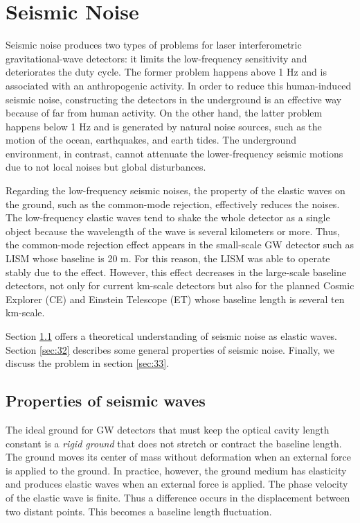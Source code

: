 \chapter{Seismic Noise} \label{chap2}
Seismic noise produces two types of problems for laser interferometric gravitational-wave detectors: it limits the low-frequency sensitivity and deteriorates the duty cycle. The former problem happens above 1 Hz and is associated with an anthropogenic activity. In order to reduce this human-induced seismic noise, constructing the detectors in the underground is an effective way because of far from human activity. On the other hand, the latter problem happens below 1 Hz and is generated by natural noise sources, such as the motion of the ocean, earthquakes, and earth tides. The underground environment, in contrast, cannot attenuate the lower-frequency seismic motions due to not local noises but global disturbances.

Regarding the low-frequency seismic noises, the property of the elastic waves on the ground, such as the common-mode rejection, effectively reduces the noises. The low-frequency elastic waves tend to shake the whole detector as a single object because the wavelength of the wave is several kilometers or more. Thus, the common-mode rejection effect appears in the small-scale GW detector such as LISM whose baseline is 20 m. For this reason, the LISM was able to operate stably due to the effect. However, this effect decreases in the large-scale baseline detectors, not only for current km-scale detectors but also for the planned Cosmic Explorer (CE) \cite{abbott2017exploring} and Einstein Telescope (ET) \cite{punturo2010einstein} whose baseline length is several ten km-scale. 

Section \cref{sec:31} offers a theoretical understanding of seismic noise as elastic waves. Section \cref{sec:32} describes some general properties of seismic noise. Finally, we discuss the problem in section \cref{sec:33}.

\section{Properties of seismic waves} \label{sec:31}
The ideal ground for GW detectors that must keep the optical cavity length constant is a {\it{rigid ground}} that does not stretch or contract the baseline length. The ground moves its center of mass without deformation when an external force is applied to the ground. In practice, however, the ground medium has elasticity and produces elastic waves when an external force is applied. The phase velocity of the elastic wave is finite. Thus a difference occurs in the displacement between two distant points. This becomes a baseline length fluctuation.

